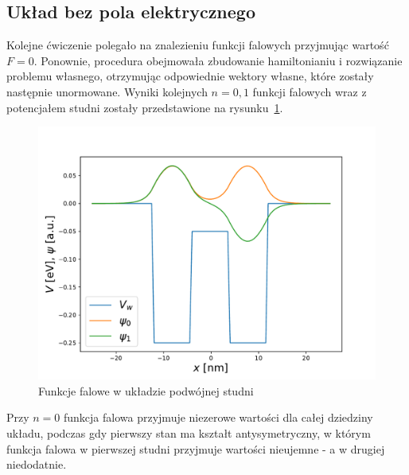 \documentclass{article}
\begin{document}
\subsection{Układ bez pola elektrycznego}
Kolejne ćwiczenie polegało na znalezieniu funkcji falowych przyjmując wartość $F = 0$.
Ponownie, procedura obejmowała zbudowanie hamiltonianiu i rozwiązanie problemu własnego, otrzymując odpowiednie wektory własne, które zostały następnie unormowane.
Wyniki kolejnych $n=0, 1$ funkcji falowych wraz z potencjałem studni zostały przedstawione na rysunku~\ref{fig:ex2}.
\begin{figure}[htp!]
    \centering
    \includegraphics[width=0.75\linewidth]{ex2.pdf}
    \caption{Funkcje falowe w układzie podwójnej studni}
    \label{fig:ex2}
\end{figure}
Przy $n=0$ funkcja falowa przyjmuje niezerowe wartości dla całej dziedziny układu, podczas gdy pierwszy stan ma kształt antysymetryczny, w którym funkcja falowa w pierwszej studni przyjmuje wartości nieujemne - a w drugiej niedodatnie.
\end{document}
